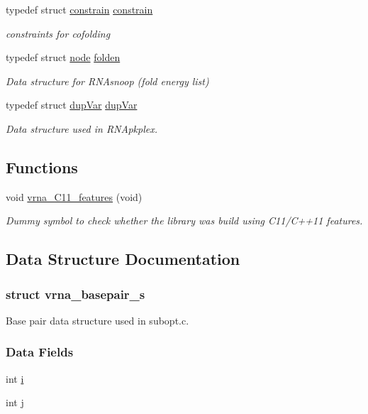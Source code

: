 \begin{DoxyCompactItemize}
typedef struct \mbox{\hyperlink{group__data__structures_structconstrain}{constrain}} \mbox{\hyperlink{group__data__structures_ga212e3afb0cc299acdfb1ec976435686e}{constrain}}
\begin{DoxyCompactList}\small\item\em constraints for cofolding \end{DoxyCompactList}\item 
typedef struct \mbox{\hyperlink{group__data__structures_structnode}{node}} \mbox{\hyperlink{group__data__structures_gaaf402058651c8218fa72788d591cda05}{folden}}
\begin{DoxyCompactList}\small\item\em Data structure for R\+N\+Asnoop (fold energy list) \end{DoxyCompactList}\item 
typedef struct \mbox{\hyperlink{group__data__structures_structdup_var}{dup\+Var}} \mbox{\hyperlink{group__data__structures_gabd3b93f9aaa9f3acce2d148bae97d24e}{dup\+Var}}
\begin{DoxyCompactList}\small\item\em Data structure used in R\+N\+Apkplex. \end{DoxyCompactList}\end{DoxyCompactItemize}
\subsection*{Functions}
\begin{DoxyCompactItemize}
\item 
void \mbox{\hyperlink{group__data__structures_ga21744ae2d6a17309f9327d3547cef0cb}{vrna\+\_\+\+C11\+\_\+features}} (void)
\begin{DoxyCompactList}\small\item\em Dummy symbol to check whether the library was build using C11/\+C++11 features. \end{DoxyCompactList}\end{DoxyCompactItemize}


\subsection{Data Structure Documentation}
\label{structvrna__basepair__s}
\subsubsection{struct vrna\+\_\+basepair\+\_\+s}
Base pair data structure used in subopt.\+c. \subsubsection*{Data Fields}
\begin{DoxyCompactItemize}
\item 
int \mbox{\hyperlink{group__data__structures_a82125b82685ad70eb6a30702a401eaa6}{i}}
\item 
int \mbox{\hyperlink{group__data__structures_af4cfcd99d33a7bd331af05163261495a}{j}}
\end{DoxyCompactItemize}


